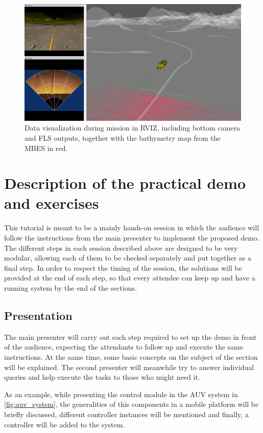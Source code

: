 \documentclass[
10pt, %
a4paper, %
oneside, %
headinclude,footinclude, %
BCOR5mm, %
]{scrartcl}
\begin{document}
\begin{figure}[h]
    \centering
    \includegraphics[width=0.9\linewidth]{Figures/rviz_pipeline.png}
    \caption{Data visualization during mission in RVIZ, including bottom camera and FLS outputs, together with the bathymetry map from the MBES in red.}
\label{fig:lolo_rviz}
\end{figure}

\section{Description of the practical demo and exercises}
\label{sec:demo}
This tutorial is meant to be a mainly hands-on session in which the audience will follow the instructions from the main presenter to implement the proposed demo.
The different steps in each session described above are designed to be very modular, allowing each of them to be checked separately and put together as a final step.
In order to respect the timing of the session, the solutions will be provided at the end of each step, so that every attendee can keep up and have a running system by the end of the sections.
\\

\subsection{\textbf{Presentation}}
The main presenter will carry out each step required to set up the demo in front of the audience, expecting the attendants to follow up and execute the same instructions.
At the same time, some basic concepts on the subject of the section will be explained.
The second presenter will meanwhile try to answer individual queries and help execute the tasks to those who might need it.

As an example, while presenting the control module in the AUV system in \ref{fig:auv_system}, the generalities of this components in a mobile platform will be briefly discussed, different controller instances will be mentioned and finally, a controller will be added to the system.
\end{document}
